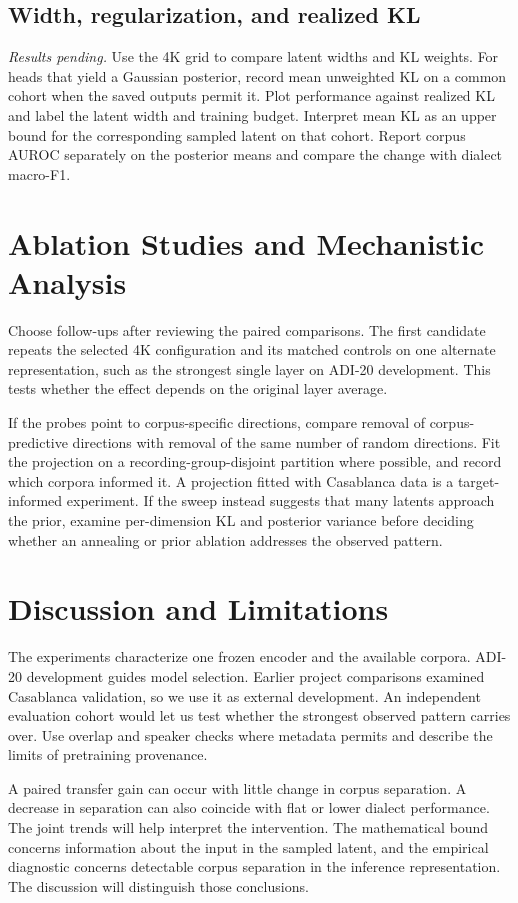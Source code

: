 \documentclass[11pt]{article}
\begin{document}
\subsection{Width, regularization, and realized KL}
\emph{Results pending.} Use the 4K grid to compare latent widths and KL weights. For heads that yield a Gaussian posterior, record mean unweighted KL on a common cohort when the saved outputs permit it. Plot performance against realized KL and label the latent width and training budget. Interpret mean KL as an upper bound for the corresponding sampled latent on that cohort. Report corpus AUROC separately on the posterior means and compare the change with dialect macro-F1.

\section{Ablation Studies and Mechanistic Analysis}
Choose follow-ups after reviewing the paired comparisons. The first candidate repeats the selected 4K configuration and its matched controls on one alternate representation, such as the strongest single layer on ADI-20 development. This tests whether the effect depends on the original layer average.

If the probes point to corpus-specific directions, compare removal of corpus-predictive directions with removal of the same number of random directions. Fit the projection on a recording-group-disjoint partition where possible, and record which corpora informed it. A projection fitted with Casablanca data is a target-informed experiment. If the sweep instead suggests that many latents approach the prior, examine per-dimension KL and posterior variance before deciding whether an annealing or prior ablation addresses the observed pattern.

\section{Discussion and Limitations}
The experiments characterize one frozen encoder and the available corpora. ADI-20 development guides model selection. Earlier project comparisons examined Casablanca validation, so we use it as external development. An independent evaluation cohort would let us test whether the strongest observed pattern carries over. Use overlap and speaker checks where metadata permits and describe the limits of pretraining provenance.

A paired transfer gain can occur with little change in corpus separation. A decrease in separation can also coincide with flat or lower dialect performance. The joint trends will help interpret the intervention. The mathematical bound concerns information about the input in the sampled latent, and the empirical diagnostic concerns detectable corpus separation in the inference representation. The discussion will distinguish those conclusions.
\end{document}
